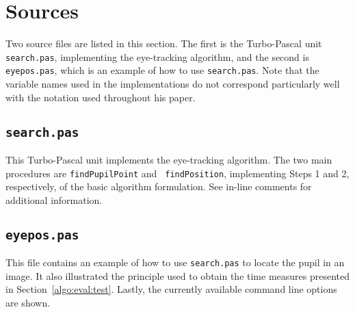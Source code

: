
\section{Sources}
\label{implem:sources}

Two source files are listed in this section.  The first is the
Turbo-Pascal unit {\tt search.pas}, implementing the {\octopus}
eye-tracking algorithm, and the second is {\tt eyepos.pas}, which is
an example of how to use {\tt search.pas}.  Note that the variable
names used in the implementations do not correspond particularly well
with the notation used throughout his paper.

\subsection{\tt search.pas}
\label{implem:sources:search}

This Turbo-Pascal unit implements the {\octopus} eye-tracking
algorithm.  The two main procedures are {\tt findPupilPoint} and {\tt
  findPosition}, implementing Steps 1 and 2, respectively, of the
basic algorithm formulation.  See in-line comments for additional
information.
\vspace*{0.5cm}

\begin{tgrind}
  
\end{tgrind}

\newpage
\subsection{\tt eyepos.pas}
\label{implem:sources:eyepos}

This file contains an example of how to use {\tt search.pas} to locate
the pupil in an image.  It also illustrated the principle used to
obtain the time measures presented in Section~\ref{algo:eval:test}.
Lastly, the currently available command line options are shown.
\vspace*{0.5cm}

\begin{tgrind}
  
\end{tgrind}
